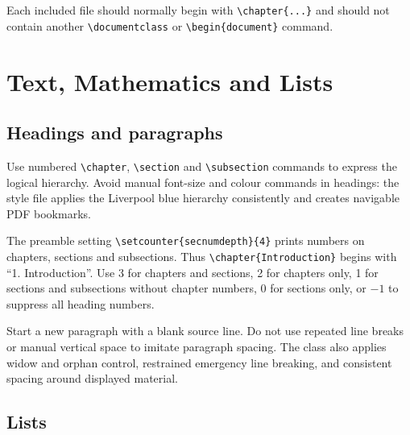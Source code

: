\documentclass[oneside,header=auto]{liverpoolthesis}
\begin{document}
Each included file should normally begin with \verb|\chapter{...}| and should not contain another \verb|\documentclass| or \verb|\begin{document}| command.

\chapter{Text, Mathematics and Lists}

\section{Headings and paragraphs}

Use numbered \verb|\chapter|, \verb|\section| and \verb|\subsection| commands to express the logical hierarchy. Avoid manual font-size and colour commands in headings: the style file applies the Liverpool blue hierarchy consistently and creates navigable PDF bookmarks.

The preamble setting \verb|\setcounter{secnumdepth}{4}| prints numbers on chapters, sections and subsections. Thus \verb|\chapter{Introduction}| begins with ``1. Introduction''. Use 3 for chapters and sections, 2 for chapters only, 1 for sections and subsections without chapter numbers, 0 for sections only, or $-1$ to suppress all heading numbers.

Start a new paragraph with a blank source line. Do not use repeated line breaks or manual vertical space to imitate paragraph spacing. The class also applies widow and orphan control, restrained emergency line breaking, and consistent spacing around displayed material.

\section{Lists}
\end{document}

